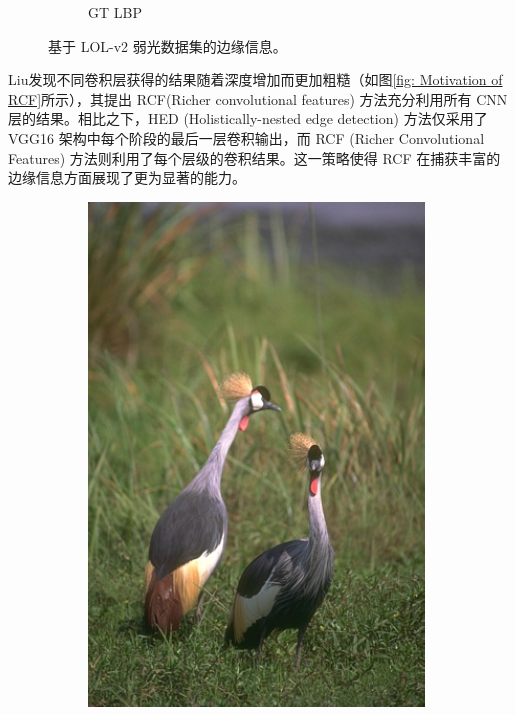 \documentclass[a4paper]{ctexart}
\begin{document}
\begin{figure}[htb]
\begin{subfigure}{0.19\textwidth}
			\captionsetup{font=scriptsize}
			\caption{GT LBP}
			\label{fig: GT_lbp}	
		\end{subfigure}
		\caption{
			\label{fig: LLI Structure Information}
			基于 LOL-v2 弱光数据集的边缘信息。
		}
	\end{figure}
	
	Liu\cite{liu2017richer}发现不同卷积层获得的结果随着深度增加而更加粗糙（如图\ref{fig: Motivation of RCF}所示），其提出 RCF(Richer convolutional features) 方法充分利用所有 CNN 层的结果。相比之下，HED (Holistically-nested edge detection) \cite{xie2015holistically}方法仅采用了 VGG16 架构中每个阶段的最后一层卷积输出，而 RCF (Richer Convolutional Features) 方法则利用了每个层级的卷积结果。这一策略使得 RCF 在捕获丰富的边缘信息方面展现了更为显著的能力。
	
	\begin{figure}[htb] 
		\centering 		
		\begin{subfigure}{0.2\textwidth}
			\includegraphics[width=\linewidth]{picture/LLIE/RCF/origin image}

\end{subfigure}
\end{figure}
\end{document}
